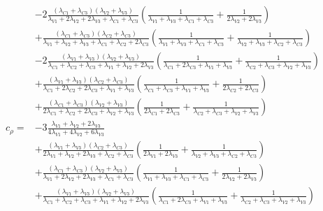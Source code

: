 {\begin{align*}
    &-2\frac{\left(\lambda_{C1}+\lambda_{C3}\right)\left(\lambda_{V2}+\lambda_{V3}\right)}{\lambda_{V1}+2\lambda_{V2}+2\lambda_{V3}+\lambda_{C1}+\lambda_{C3}}\left(\frac{1}{\lambda_{V1}+\lambda_{V3}+\lambda_{C1}+\lambda_{C3}}+\frac{1}{2\lambda_{V2}+2\lambda_{V3}}\right)\\
    &+\frac{\left(\lambda_{C1}+\lambda_{C3}\right)\left(\lambda_{C2}+\lambda_{C3}\right)}{\lambda_{V1}+\lambda_{V2}+\lambda_{V3}+\lambda_{C1}+\lambda_{C2}+2\lambda_{C3}}\left(\frac{1}{\lambda_{V1}+\lambda_{V3}+\lambda_{C1}+\lambda_{C3}}+\frac{1}{\lambda_{V2}+\lambda_{V3}+\lambda_{C2}+\lambda_{C3}}\right)\\
    &-2\frac{\left(\lambda_{V1}+\lambda_{V3}\right)\left(\lambda_{V2}+\lambda_{V3}\right)}{\lambda_{C1}+\lambda_{C2}+\lambda_{C3}+\lambda_{V1}+\lambda_{V2}+2\lambda_{V3}}\left(\frac{1}{\lambda_{C1}+2\lambda_{C3}+\lambda_{V1}+\lambda_{V3}}+\frac{1}{\lambda_{C2}+\lambda_{C3}+\lambda_{V2}+\lambda_{V3}}\right)\\
    &+\frac{\left(\lambda_{V1}+\lambda_{V3}\right)\left(\lambda_{C2}+\lambda_{C3}\right)}{\lambda_{C1}+2\lambda_{C2}+2\lambda_{C3}+\lambda_{V1}+\lambda_{V3}}\left(\frac{1}{\lambda_{C1}+\lambda_{C3}+\lambda_{V1}+\lambda_{V3}}+\frac{1}{2\lambda_{C2}+2\lambda_{C3}}\right)\\
    &+\frac{\left(\lambda_{C1}+\lambda_{C3}\right)\left(\lambda_{V2}+\lambda_{V3}\right)}{2\lambda_{C1}+\lambda_{C2}+2\lambda_{C3}+\lambda_{V2}+\lambda_{V3}}\left(\frac{1}{2\lambda_{C1}+2\lambda_{C3}}+\frac{1}{\lambda_{C2}+\lambda_{C3}+\lambda_{V2}+\lambda_{V3}}\right)\\
    c_{\rho}=&-3\frac{\lambda_{V1}+\lambda_{V2}+2\lambda_{V3}}{4\lambda_{V1}+4\lambda_{V2}+6\lambda_{V3}}\\
    &+\frac{\left(\lambda_{V1}+\lambda_{V3}\right)\left(\lambda_{C2}+\lambda_{C3}\right)}{2\lambda_{V1}+\lambda_{V2}+2\lambda_{V3}+\lambda_{C2}+\lambda_{C3}}\left(\frac{1}{2\lambda_{V1}+2\lambda_{V3}}+\frac{1}{\lambda_{V2}+\lambda_{V3}+\lambda_{C2}+\lambda_{C3}}\right)\\
    &+\frac{\left(\lambda_{C1}+\lambda_{C3}\right)\left(\lambda_{V2}+\lambda_{V3}\right)}{\lambda_{V1}+2\lambda_{V2}+2\lambda_{V3}+\lambda_{C1}+\lambda_{C3}}\left(\frac{1}{\lambda_{V1}+\lambda_{V3}+\lambda_{C1}+\lambda_{C3}}+\frac{1}{2\lambda_{V2}+2\lambda_{V3}}\right)\\
    &+\frac{\left(\lambda_{V1}+\lambda_{V3}\right)\left(\lambda_{V2}+\lambda_{V3}\right)}{\lambda_{C1}+\lambda_{C2}+\lambda_{C3}+\lambda_{V1}+\lambda_{V2}+2\lambda_{V3}}\left(\frac{1}{\lambda_{C1}+2\lambda_{C3}+\lambda_{V1}+\lambda_{V3}}+\frac{1}{\lambda_{C2}+\lambda_{C3}+\lambda_{V2}+\lambda_{V3}}\right)
\end{align*}}
